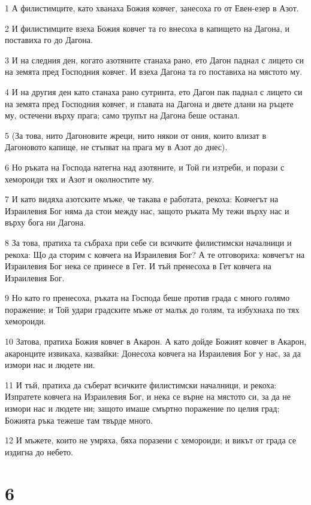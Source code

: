 \par 1 А филистимците, като хванаха Божия ковчег, занесоха го от Евен-езер в Азот.
\par 2 И филистимците взеха Божия ковчег та го внесоха в капището на Дагона, и поставиха го до Дагона.
\par 3 И на следния ден, когато азотяните станаха рано, ето Дагон паднал с лицето си на земята пред Господния ковчег. И взеха Дагона та го поставиха на мястото му.
\par 4 И на другия ден като станаха рано сутринта, ето Дагон пак паднал с лицето си на земята пред Господния ковчег, и главата на Дагона и двете длани на ръцете му, остечени върху прага; само трупът на Дагона беше останал.
\par 5 (За това, нито Дагоновите жреци, нито някои от ония, които влизат в Дагоновото капище, не стъпват на прага му в Азот до днес).
\par 6 Но ръката на Господа натегна над азотяните, и Той ги изтреби, и порази с хемороиди тях и Азот и околностите му.
\par 7 И като видяха азотските мъже, че такава е работата, рекоха: Ковчегът на Израилевия Бог няма да стои между нас, защото ръката Му тежи върху нас и върху бога ни Дагона.
\par 8 За това, пратиха та събраха при себе си всичките филистимски началници и рекоха: Що да сторим с ковчега на Израилевия Бог? А те отговориха: ковчегът на Израилевия Бог нека се принесе в Гет. И тъй пренесоха в Гет ковчега на Израилевия Бог.
\par 9 Но като го пренесоха, ръката на Господа беше против града с много голямо поражение; и Той удари градските мъже от малък до голям, та избухнаха по тях хемороиди.
\par 10 Затова, пратиха Божия ковчег в Акарон. А като дойде Божият ковчег в Акарон, акаронците извикаха, казвайки: Донесоха ковчега на Израилевия Бог у нас, за да измори нас и людете ни.
\par 11 И тъй, пратиха да съберат всичките филистимски началници, и рекоха: Изпратете ковчега на Израилевия Бог, и нека се върне на мястото си, за да не измори нас и людете ни; защото имаше смъртно поражение по целия град; Божията ръка тежеше там твърде много.
\par 12 И мъжете, които не умряха, бяха поразени с хемороиди; и викът от града се издигна до небето.

\chapter{6}


